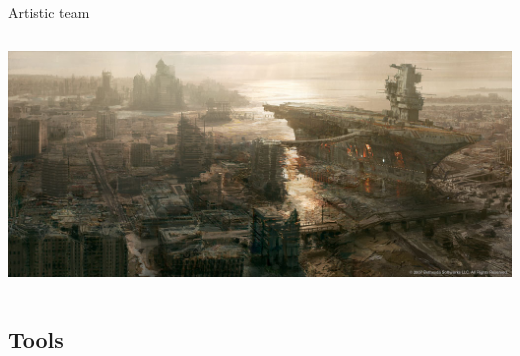 \documentclass[10pt,compress]{beamer} %
\begin{document}
\begin{frame}{Artistic team}
\begin{columns}
		\includegraphics[width=\linewidth]{figs/fallout-3-0053}
	\end{columns}
\end{frame}

\subsection{Tools}
\end{document}
